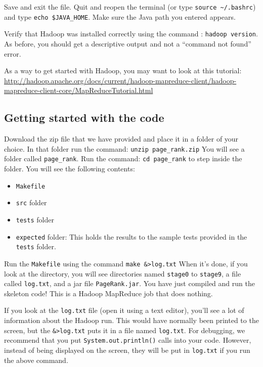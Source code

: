 \documentclass[10pt]{article}
\begin{document}
Save and exit the file. Quit and reopen the terminal (or type \texttt{source \~{}/.bashrc}) and type \texttt{echo \$JAVA\_HOME}.  Make sure the Java path you entered appears.

Verify that Hadoop was installed correctly using the command : \texttt{hadoop version}.
As before, you should get a descriptive output and not a ``command not found'' error.

As a way to get started with Hadoop, you may want to look at this tutorial:
\url{http://hadoop.apache.org/docs/current/hadoop-mapreduce-client/hadoop-mapreduce-client-core/MapReduceTutorial.html}

\subsection{Getting started with the code}

Download the zip file that we have provided and place it in a folder of your choice. In that folder run the command: \texttt{unzip page\_rank.zip} You will see a folder called \texttt{page\_rank}. Run the command: \texttt{cd page\_rank} to step inside the folder.  You will see the following contents:
\begin{itemize}
	\item \texttt{Makefile}
	\item \texttt{src} folder
	\item \texttt{tests} folder
	\item \texttt{expected} folder: This holds the results to the sample tests provided in the \texttt{tests} folder.
\end{itemize}
 
Run the \texttt{Makefile} using the command \texttt{make \&>log.txt}
When it's done, if you look at the directory, you will see directories named \texttt{stage0} to \texttt{stage9}, a file called \texttt{log.txt}, and a jar file \texttt{PageRank.jar}.  You have just compiled and run the skeleton code! This is a Hadoop MapReduce job that does nothing.

If you look at the \texttt{log.txt} file (open it using a text editor), you'll see a lot of information about the Hadoop run. This would have normally been printed to the screen, but the \texttt{\&>log.txt} puts it in a file named \texttt{log.txt}. For debugging, we recommend that you put \texttt{System.out.println()} calls into your code. However, instead of being displayed on the screen, they will be put in \texttt{log.txt} if you run the above command.
\end{document}
